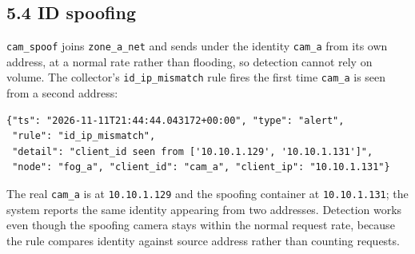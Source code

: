 \subsection*{5.4 ID spoofing}

\texttt{cam\_spoof} joins \texttt{zone\_a\_net} and sends under the identity
\texttt{cam\_a} from its own address, at a normal rate rather than
flooding, so detection cannot rely on volume. The collector's
\texttt{id\_ip\_mismatch} rule fires the first time \texttt{cam\_a} is seen
from a second address:

\begin{lstlisting}[caption={Spoof detected (results/spoof\_alerts.jsonl)}]
{"ts": "2026-11-11T21:44:44.043172+00:00", "type": "alert",
 "rule": "id_ip_mismatch",
 "detail": "client_id seen from ['10.10.1.129', '10.10.1.131']",
 "node": "fog_a", "client_id": "cam_a", "client_ip": "10.10.1.131"}
\end{lstlisting}

The real \texttt{cam\_a} is at \texttt{10.10.1.129} and the spoofing
container at \texttt{10.10.1.131}; the system reports the same identity
appearing from two addresses. Detection works even though the spoofing
camera stays within the normal request rate, because the rule compares
identity against source address rather than counting requests.
